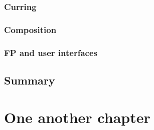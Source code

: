 \documentclass[12pt]{book}
\begin{document}
\subsection*{Curring}

\subsection*{Composition}

\subsection*{FP and user interfaces}

\section{Summary}

\chapter{One another chapter}
\end{document}
